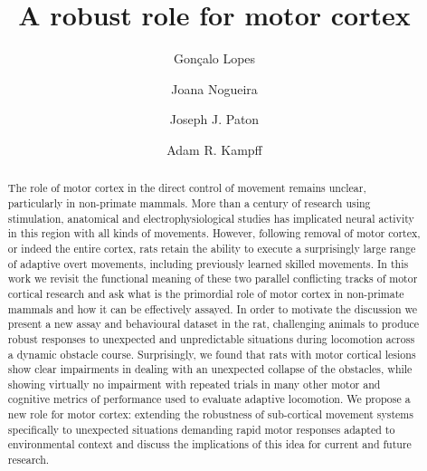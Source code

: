 \documentclass[12pt]{article}
\title{A robust role for motor cortex}
\author{Gonçalo Lopes}
\author{Joana Nogueira}
\author{Joseph J. Paton}
\author{Adam R. Kampff}
\affil{Champalimaud Neuroscience Programme\\ Champalimaud Centre for the Unknown, Lisbon, Portugal}
\newcounter{video}
\begin{document}
\maketitle

\begin{linenumbers}
\begin{abstract}
The role of motor cortex in the direct control of movement remains unclear, particularly in non-primate mammals. More than a century of research using stimulation, anatomical and electrophysiological studies has implicated neural activity in this region with all kinds of movements. However, following removal of motor cortex, or indeed the entire cortex, rats retain the ability to execute a surprisingly large range of adaptive overt movements, including previously learned skilled movements. In this work we revisit the functional meaning of these two parallel conflicting tracks of motor cortical research and ask what is the primordial role of motor cortex in non-primate mammals and how it can be effectively assayed. In order to motivate the discussion we present a new assay and behavioural dataset in the rat, challenging animals to produce robust responses to unexpected and unpredictable situations during locomotion across a dynamic obstacle course. Surprisingly, we found that rats with motor cortical lesions show clear impairments in dealing with an unexpected collapse of the obstacles, while showing virtually no impairment with repeated trials in many other motor and cognitive metrics of performance used to evaluate adaptive locomotion. We propose a new role for motor cortex: extending the robustness of sub-cortical movement systems specifically to unexpected situations demanding rapid motor responses adapted to environmental context and discuss the implications of this idea for current and future research.
\end{abstract}








\end{linenumbers}
\printbibliography
\end{document}
